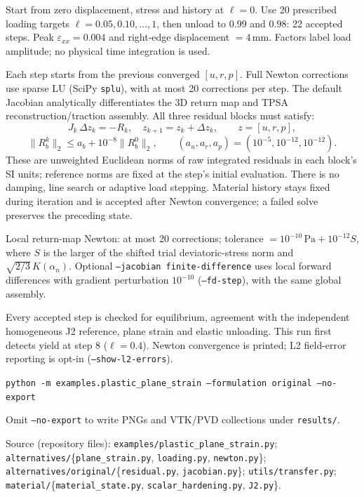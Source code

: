 \documentclass[10pt,a4paper]{article}
\newcommand{\topic}[1]{\par\vspace{4pt}{\color{accent}\bfseries\large #1}\par}
\begin{document}
\topic{Loading and Newton solve}
Start from zero displacement, stress and history at $\ell=0$. Use 20 prescribed
loading targets $\ell=0.05,0.10,\ldots,1$, then unload to $0.99$ and $0.98$:
22 accepted steps. Peak $\varepsilon_{xx}=0.004$ and right-edge displacement
$=4\,\mathrm{mm}$. Factors label load amplitude; no physical time integration
is used.

Each step starts from the previous converged $[u,r,p]$. Full Newton corrections
use sparse LU (SciPy \texttt{splu}), with at most 20 corrections per step.
The default Jacobian analytically differentiates the 3D return map and TPSA
reconstruction/traction assembly. All three residual blocks must satisfy:
\[
 J_k\,\Delta z_k=-R_k,\quad z_{k+1}=z_k+\Delta z_k,\qquad z=[u,r,p],
\]
\[
 \|R_b^k\|_2\leq a_b+10^{-8}\|R_b^0\|_2,\qquad
 (a_u,a_r,a_p)=(10^{-5},10^{-12},10^{-12}).
\]
These are unweighted Euclidean norms of raw integrated residuals in each
block's SI units; reference norms are fixed at the step's initial evaluation.
There is no damping, line search or adaptive load stepping. Material history
stays fixed during iteration and is accepted after Newton convergence; a failed
solve preserves the preceding state.

Local return-map Newton: at most 20 corrections; tolerance
$=10^{-10}\,\mathrm{Pa}+10^{-12}S$, where $S$ is the larger of the shifted trial
deviatoric-stress norm and $\sqrt{2/3}\,K(\alpha_n)$.
Optional \texttt{--jacobian finite-difference} uses local forward differences
with gradient perturbation $10^{-10}$ (\texttt{--fd-step}), with the same
global assembly.

\topic{Checks and execution}
Every accepted step is checked for equilibrium, agreement with the independent
homogeneous J2 reference, plane strain and elastic unloading. This run
first detects yield at step 8 ($\ell=0.4$). Newton convergence is printed;
L2 field-error reporting is opt-in (\texttt{--show-l2-errors}).

\texttt{python -m examples.plastic\_plane\_strain --formulation original --no-export}

Omit \texttt{--no-export} to write PNGs and VTK/PVD collections under
\texttt{results/}.

\vfill
{\scriptsize Source (repository files): \texttt{examples/plastic\_plane\_strain.py};
\texttt{alternatives/}\{\texttt{plane\_strain.py}, \texttt{loading.py}, \texttt{newton.py}\};
\texttt{alternatives/original/}\{\texttt{residual.py}, \texttt{jacobian.py}\};
\texttt{utils/transfer.py};
\texttt{material/}\{\texttt{material\_state.py}, \texttt{scalar\_hardening.py}, \texttt{J2.py}\}.}
\end{document}
